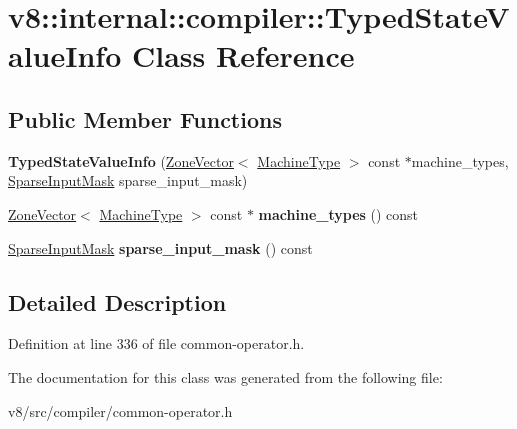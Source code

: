 \hypertarget{classv8_1_1internal_1_1compiler_1_1TypedStateValueInfo}{}\section{v8\+:\+:internal\+:\+:compiler\+:\+:Typed\+State\+Value\+Info Class Reference}
\label{classv8_1_1internal_1_1compiler_1_1TypedStateValueInfo}
\subsection*{Public Member Functions}
\begin{DoxyCompactItemize}
\item 
\mbox{\label{classv8_1_1internal_1_1compiler_1_1TypedStateValueInfo_a9a5d388ce202400c1dcfcc18309211f7}} 
{\bfseries Typed\+State\+Value\+Info} (\mbox{\hyperlink{classv8_1_1internal_1_1ZoneVector}{Zone\+Vector}}$<$ \mbox{\hyperlink{classv8_1_1internal_1_1MachineType}{Machine\+Type}} $>$ const $\ast$machine\+\_\+types, \mbox{\hyperlink{classv8_1_1internal_1_1compiler_1_1SparseInputMask}{Sparse\+Input\+Mask}} sparse\+\_\+input\+\_\+mask)
\item 
\mbox{\label{classv8_1_1internal_1_1compiler_1_1TypedStateValueInfo_a1e7a93f36ddb1bb4d33c351e044e27c3}} 
\mbox{\hyperlink{classv8_1_1internal_1_1ZoneVector}{Zone\+Vector}}$<$ \mbox{\hyperlink{classv8_1_1internal_1_1MachineType}{Machine\+Type}} $>$ const  $\ast$ {\bfseries machine\+\_\+types} () const
\item 
\mbox{\label{classv8_1_1internal_1_1compiler_1_1TypedStateValueInfo_ac2e270929f02deb081233a77d0d94db2}} 
\mbox{\hyperlink{classv8_1_1internal_1_1compiler_1_1SparseInputMask}{Sparse\+Input\+Mask}} {\bfseries sparse\+\_\+input\+\_\+mask} () const
\end{DoxyCompactItemize}


\subsection{Detailed Description}


Definition at line 336 of file common-\/operator.\+h.



The documentation for this class was generated from the following file\+:\begin{DoxyCompactItemize}
\item 
v8/src/compiler/common-\/operator.\+h\end{DoxyCompactItemize}

